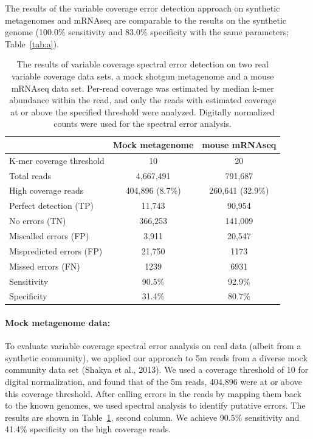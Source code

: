 \documentclass{article}
\begin{document}
The results of the variable coverage error detection approach on
synthetic metagenomes and mRNAseq are comparable to the results
on the synthetic genome (100.0\% sensitivity and 83.0\%
specificity with the same parameters; Table~\ref{tab:a}).


\begin{table}
\begin{tabular}{|l|c||c|}
\hline
& Mock metagenome & mouse mRNAseq \\
\hline
K-mer coverage threshold   & 10              & 20 \\
Total reads                & 4,667,491       & 791,687 \\
High coverage reads        & 404,896 (8.7\%) & 260,641 (32.9\%) \\
\hline
Perfect detection (TP)     & 11,743          & 90,954 \\
No errors (TN)             & 366,253         & 141,009 \\
Miscalled errors (FP)      & 3,911           & 20,547 \\
Mispredicted errors (FP)   & 21,750          & 1173 \\
Missed errors (FN)         & 1239            & 6931 \\
\hline
Sensitivity                & 90.5\%          & 92.9\% \\
Specificity                & 31.4\%          & 80.7\% \\
\hline
\end{tabular}

\caption{The results of variable coverage spectral error detection on
  two real variable coverage data sets, a mock shotgun metagenome and
  a mouse mRNAseq data set. Per-read coverage was estimated by median
  k-mer abundance within the read, and only the reads with estimated
  coverage at or above the specified threshold were analyzed.
  Digitally normalized counts were used for the spectral error analysis.}
\label{tab:spectra_variable_real}

\end{table}

\paragraph{Mock metagenome data:}


To evaluate variable coverage spectral error analysis on real data
(albeit from a synthetic community), we applied our approach to 5m
reads from a diverse mock community data set (Shakya et al., 2013). We
used a coverage threshold of 10 for digital normalization, and found
that of the 5m reads, 404,896 were at or above this coverage
threshold.  After calling errors in the reads by mapping them back to
the known genomes, we used spectral analysis to identify putative
errors.  The results are shown in
Table~\ref{tab:spectra_variable_real}, second column.  We achieve
90.5\% sensitivity and 41.4\% specificity on the high coverage reads.
\end{document}
